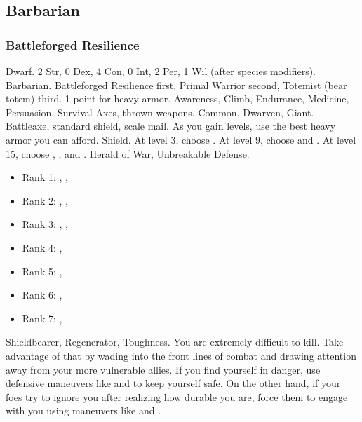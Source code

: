     \subsection{Barbarian}

        \subsubsection{Battleforged Resilience}
             Dwarf.
             2 Str, 0 Dex, 4 Con, 0 Int, 2 Per, 1 Wil (after species modifiers).
             Barbarian.
             Battleforged Resilience first, Primal Warrior second, Totemist (bear totem) third.
             1 point for heavy armor.
             Awareness, Climb, Endurance, Medicine, Persuasion, Survival
             Axes, thrown weapons.
             Common, Dwarven, Giant.
             Battleaxe, standard shield, scale mail. As you gain levels, use the best heavy armor you can afford.
             Shield.
                At level 3, choose .
                At level 9, choose  and .
                At level 15, choose , , and .
             Herald of War, Unbreakable Defense.
            \begin{itemize}
                \item Rank 1: , , 
                \item Rank 2: , , 
                \item Rank 3: , , 
                \item Rank 4: , 
                \item Rank 5: , 
                \item Rank 6: , 
                \item Rank 7: , 
            \end{itemize}
             Shieldbearer, Regenerator, Toughness.
             You are extremely difficult to kill.
            Take advantage of that by wading into the front lines of combat and drawing attention away from your more vulnerable allies.
            If you find yourself in danger, use defensive maneuvers like  and  to keep yourself safe.
            On the other hand, if your foes try to ignore you after realizing how durable you are, force them to engage with you using maneuvers like  and .


